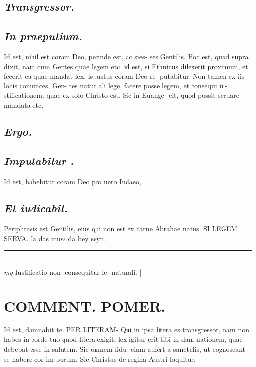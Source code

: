 \documentclass{article}
\begin{document}
\begin{pages}
\subsection*{\textit{Transgressor. }}
{}
\subsection*{\textit{In praeputium. }}\pstart Id est, nihil est coram Deo, perinde est, ac sies- ses Gentilis.  \pend\pstart Hoc est, quod supra dixit, nam cum Gentes quae legem etc. id est, si Ethnicus dilexerit proximum, et fecerit ea quae mandat lex, is iustus coram Deo re- putabitur. Non tamen ex iis locis conuinces, Gen- tes natur ali lege, facere posse legem, et consequi iu- stificationem, quae ex solo Christo est. Sic in Euange- cit, quod possit seruare mandata etc.   \pend
{}
{}
\subsection*{\textit{Ergo. }}
{}
\subsection*{\textit{Imputabitur . }}\pstart Id est, habebitur coram Deo pro uero Iudaeo,  \pend
{}
{}
\subsection*{\textit{Et iudicabit. }}\pstart Periphrasis est Gentilis, eius qui non est ex carne Abrahae natus. SI LEGEM SERVA.  Ia das muss da bey seyn.   \pend
\vspace{0.5cm}\noindent
\vspace{0.2cm}\rule{1cm}{0.2pt}\\ 
\hspace{0.2cm}\textit{mg}
\footnotesize Iustificatio non- consequitur le- naturali. 
\normalsize| 
\section*{COMMENT. POMER.  }\pstart Id est, damnabit te. PER LITERAM- Qui in ipsa litera es transgressor, nam non habes in corde tuo quod litera exigit, lex igitur erit tibi in dam nationem, quae debebat esse in salutem. Sic omnem fidu- ciam aufert a sanctulis, ut cognoscant se habere cor im purum. Sic Christus de regina Austri loquitur.  \pend
{}
{}

\end{pages}
\end{document}
